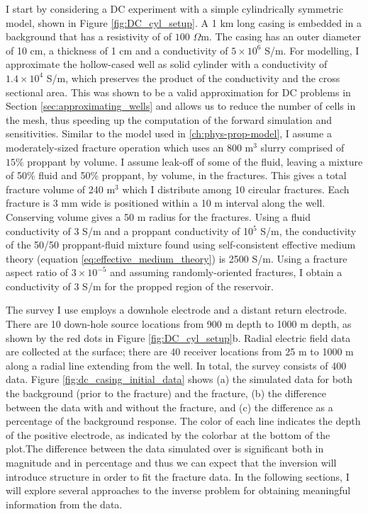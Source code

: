 I start by considering a DC experiment with a simple cylindrically symmetric model, shown in Figure \ref{fig:DC_cyl_setup}. A 1 km long casing is embedded in a background that has a resistivity of of $100$ $\Omega$m. The casing has an outer diameter of 10 cm, a thickness of 1 cm and a conductivity of $5 \times 10^6$ S/m. For modelling, I approximate the hollow-cased well as solid cylinder with a conductivity of $1.4 \times 10^4$ S/m, which preserves the product of the conductivity and the cross sectional area. This was shown to be a valid approximation for DC problems in Section \ref{sec:approximating_wells} and allows us to reduce the number of cells in the mesh, thus speeding up the computation of the forward simulation and sensitivities. Similar to the model used in \ref{ch:phys-prop-model}, I assume a moderately-sized fracture operation which uses an 800 m$^3$ slurry comprised of $15\%$ proppant by volume. I assume leak-off of some of the fluid, leaving a mixture of 50\% fluid and 50\% proppant, by volume, in the fractures. This gives a total fracture volume of 240 m$^3$ which I distribute among 10 circular fractures. Each fracture is 3 mm wide is positioned within a 10 m interval along the well. Conserving volume gives a 50 m radius for the fractures. Using a fluid conductivity of 3 S/m and a proppant conductivity of 10$^5$ S/m, the conductivity of the 50/50 proppant-fluid mixture found using self-consistent effective medium theory (equation \ref{eq:effective_medium_theory}) is 2500 S/m. Using a fracture aspect ratio of $3 \times 10^{-5}$ and assuming randomly-oriented fractures, I obtain a conductivity of 3 S/m for the propped region of the reservoir.




The survey I use employs a downhole electrode and a distant return electrode. There are 10 down-hole source locations from 900 m depth to 1000 m depth, as shown by the red dots in Figure \ref{fig:DC_cyl_setup}b. Radial electric field data are collected at the surface; there are 40 receiver locations from 25 m to 1000 m along a radial line extending from the well. In total, the survey consists of 400 data. Figure \ref{fig:dc_casing_initial_data} shows (a) the simulated data for both the background (prior to the fracture) and the fracture, (b) the difference between the data with and without the fracture, and (c) the difference as a percentage of the background response. The color of each line indicates the depth of the positive electrode, as indicated by the colorbar at the bottom of the plot.The difference between the data simulated over is significant both in magnitude and in percentage and thus we can expect that the inversion will introduce structure in order to fit the fracture data. In the following sections, I will explore several approaches to the inverse problem for obtaining meaningful information from the data.


